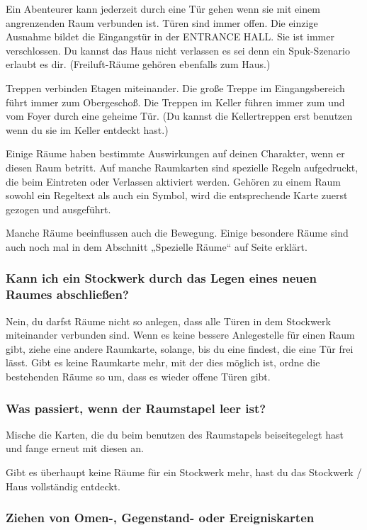 Ein Abenteurer kann jederzeit durch eine Tür gehen wenn sie mit einem angrenzenden Raum verbunden ist. Türen sind immer offen. Die einzige Ausnahme bildet die Eingangstür in der ENTRANCE HALL. Sie ist immer verschlossen. Du kannst das Haus nicht verlassen es sei denn ein Spuk-Szenario erlaubt es dir. (Freiluft-Räume gehören ebenfalls zum Haus.)

Treppen verbinden Etagen miteinander. Die große Treppe im Eingangsbereich führt immer zum Obergeschoß. Die Treppen im Keller führen immer zum und vom Foyer durch eine geheime Tür. (Du kannst die Kellertreppen erst benutzen wenn du sie im Keller entdeckt
hast.)

Einige Räume haben bestimmte Auswirkungen auf deinen Charakter, wenn er diesen Raum betritt. Auf manche Raumkarten sind spezielle Regeln aufgedruckt, die beim Eintreten oder Verlassen aktiviert werden. Gehören zu einem Raum sowohl ein Regeltext als auch ein Symbol, wird die entsprechende Karte zuerst gezogen und ausgeführt.

Manche Räume beeinflussen auch die Bewegung. Einige besondere Räume sind auch noch mal in dem Abschnitt „Spezielle Räume“ auf Seite \pageref{kap:rules:specialrooms} erklärt.


\subsubsection{Kann ich ein Stockwerk durch das Legen eines neuen Raumes abschließen?}

Nein, du darfst Räume nicht so anlegen, dass alle Türen in dem Stockwerk miteinander verbunden sind. Wenn es keine bessere Anlegestelle für einen Raum gibt, ziehe eine andere Raumkarte, solange, bis du eine findest, die eine Tür frei lässt. Gibt es keine Raumkarte mehr, mit der dies möglich ist, ordne die bestehenden Räume so um, dass es wieder offene Türen gibt.

\subsubsection{Was passiert, wenn der Raumstapel leer ist?}

Mische die Karten, die du beim benutzen des Raumstapels beiseitegelegt hast und fange erneut mit diesen an.

Gibt es überhaupt keine Räume für ein Stockwerk mehr, hast du das Stockwerk / Haus vollständig entdeckt.

\subsubsection{Ziehen von Omen-, Gegenstand- oder Ereigniskarten}

